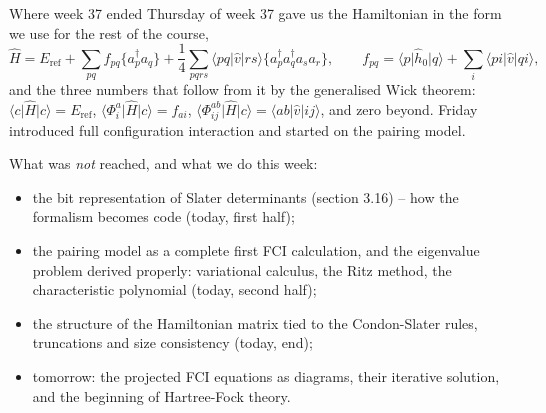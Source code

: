 \documentclass[aspectratio=169,10pt]{beamer}
\newcommand{\ket}[1]{\vert #1\rangle}
\newcommand{\bra}[1]{\langle #1\vert}
\newcommand{\element}[3]{\langle #1\vert #2\vert #3\rangle}
\newcommand{\nc}[1]{\bigl\{#1\bigr\}}
\begin{document}
\begin{frame}{Where week 37 ended}
  \small
  Thursday of week 37 gave us the Hamiltonian in the form we use for the rest of the course,
  \[
    \hat{H}=E_{\mathrm{ref}}+\sum_{pq}f_{pq}\nc{a_p^{\dagger}a_q}+\frac14\sum_{pqrs}\element{pq}{\hat{v}}{rs}\nc{a_p^{\dagger}a_q^{\dagger}a_sa_r},
    \qquad f_{pq}=\element{p}{\hat{h}_0}{q}+\sum_i\element{pi}{\hat{v}}{qi},
  \]
  and the three numbers that follow from it by the generalised Wick theorem: $\bra{c}\hat{H}\ket{c}=E_{\mathrm{ref}}$, $\bra{\Phi_i^a}\hat{H}\ket{c}=f_{ai}$, $\bra{\Phi_{ij}^{ab}}\hat{H}\ket{c}=\element{ab}{\hat{v}}{ij}$, and zero beyond. Friday introduced full configuration interaction and started on the pairing model.
  \vspace{0.3em}

  What was \emph{not} reached, and what we do this week:
  \begin{itemize}
    \item the \alert{bit representation} of Slater determinants (section 3.16) -- how the formalism becomes code (today, first half);
    \item the pairing model as a complete first FCI calculation, and the \alert{eigenvalue problem derived properly}: variational calculus, the Ritz method, the characteristic polynomial (today, second half);
    \item the \alert{structure of the Hamiltonian matrix} tied to the Condon-Slater rules, \alert{truncations and size consistency} (today, end);
    \item tomorrow: the projected FCI equations as \alert{diagrams}, their iterative solution, and the beginning of \alert{Hartree-Fock theory}.
  \end{itemize}
\end{frame}
\end{document}
